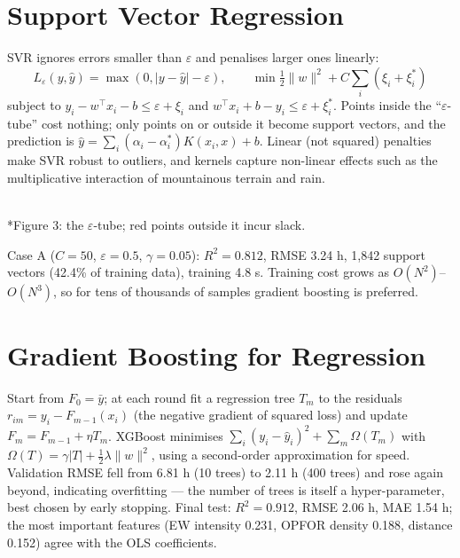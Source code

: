 \documentclass[11pt]{article}
\begin{document}
\section{Support Vector Regression}
SVR ignores errors smaller than $\varepsilon$ and penalises larger ones linearly:
\[L_\varepsilon(y,\hat y)=\max(0,|y-\hat y|-\varepsilon),\qquad\min\tfrac12\|w\|^2+C\sum_i(\xi_i+\xi_i^*)\]
subject to $y_i-w^\top x_i-b\le\varepsilon+\xi_i$ and $w^\top x_i+b-y_i\le\varepsilon+\xi_i^*$. Points inside the ``$\varepsilon$-tube'' cost nothing; only points on or outside it become support vectors, and the prediction is $\hat y=\sum_i(\alpha_i-\alpha_i^*)K(x_i,x)+b$. Linear (not squared) penalties make SVR robust to outliers, and kernels capture non-linear effects such as the multiplicative interaction of mountainous terrain and rain.
\begin{center}\\*{\small\color{GreyN}Figure 3: the $\varepsilon$-tube; red points outside it incur slack.}\end{center}
Case A ($C=50$, $\varepsilon=0.5$, $\gamma=0.05$): $R^2=0.812$, RMSE 3.24 h, 1,842 support vectors (42.4\% of training data), training 4.8 s. Training cost grows as $O(N^2)$--$O(N^3)$, so for tens of thousands of samples gradient boosting is preferred.

\section{Gradient Boosting for Regression}
Start from $F_0=\bar y$; at each round fit a regression tree $T_m$ to the residuals $r_{im}=y_i-F_{m-1}(x_i)$ (the negative gradient of squared loss) and update $F_m=F_{m-1}+\eta T_m$. XGBoost minimises $\sum_i(y_i-\hat y_i)^2+\sum_m\Omega(T_m)$ with $\Omega(T)=\gamma|T|+\tfrac12\lambda\|w\|^2$, using a second-order approximation for speed. Validation RMSE fell from 6.81 h (10 trees) to 2.11 h (400 trees) and rose again beyond, indicating overfitting --- the number of trees is itself a hyper-parameter, best chosen by early stopping. Final test: $R^2=0.912$, RMSE 2.06 h, MAE 1.54 h; the most important features (EW intensity 0.231, OPFOR density 0.188, distance 0.152) agree with the OLS coefficients.
\end{document}
